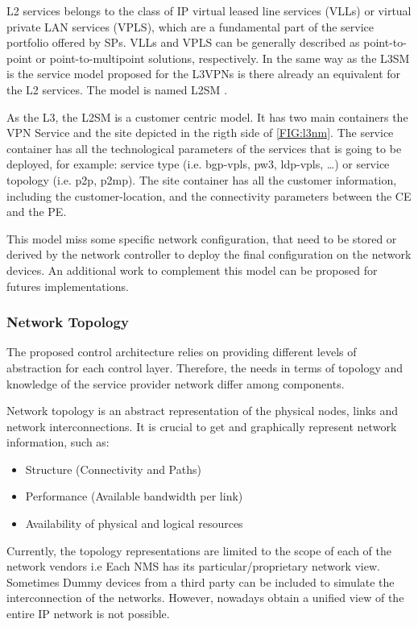 \documentclass[a4paper,fleqn]{cas-dc}
\begin{document}
L2 services belongs to the class of IP virtual leased line services (VLLs) or virtual private LAN services (VPLS)\cite{andersson2006framework}, which are a fundamental part of the service portfolio offered by SPs. 
VLLs and VPLS can be generally described as point-to-point or point-to-multipoint solutions, respectively. In the same way as the L3SM is the service model proposed for the L3VPNs is there already an equivalent for the L2 services. The model is named L2SM \cite{wen2018yang}. 

As the L3, the L2SM is a customer centric model. It has two main containers the VPN Service and the site depicted in the rigth side of \cref{FIG:l3nm}. The service container has all the technological parameters of the services that is going to be deployed, for example: service type (i.e. bgp-vpls, pw3, ldp-vpls, \dots) or service topology (i.e. p2p, p2mp). The site container has all the customer information, including the customer-location, and the connectivity parameters between the CE and the PE. 

This model miss some specific network configuration, that need to be stored or derived by the network controller to deploy the final configuration on the network devices. An additional work to complement this model can be proposed for futures implementations.  

\subsubsection{Network Topology}
\label{subsection:IPtopo}

The proposed control architecture relies on providing different levels of abstraction for each control layer. Therefore, the needs in terms of topology and knowledge of the service provider network differ among components. 

Network topology is an abstract representation of the physical nodes, links and network interconnections. It is crucial to get and graphically represent network information, such as:
\begin{itemize}
    \item Structure (Connectivity and Paths)
    \item Performance (Available bandwidth per link)
    \item Availability of physical and logical resources
\end{itemize}

Currently, the topology representations are limited to the scope of each of the network vendors i.e Each NMS has its particular/proprietary network view. Sometimes Dummy devices from a third party can be included to simulate the interconnection of the networks. However, nowadays obtain a unified view of the entire IP network is not possible.
\end{document}
